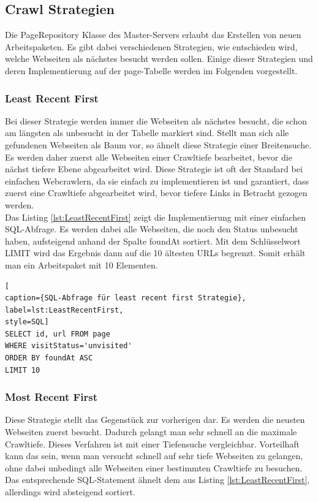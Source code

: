 \subsection{Crawl Strategien}
\label{subsec:CrawlStrategien}
Die PageRepository Klasse des Master-Servers erlaubt das Erstellen von neuen Arbeitspaketen. Es gibt dabei verschiedenen Strategien, wie entschieden wird, welche Webseiten als nächstes besucht werden sollen. Einige dieser Strategien und deren Implementierung auf der page-Tabelle werden im Folgenden vorgestellt.
\subsubsection{Least Recent First} 
Bei dieser Strategie werden immer die Webseiten als nächstes besucht, die schon am längsten als unbesucht in der Tabelle markiert sind. Stellt man sich alle gefundenen Webseiten als Baum vor, so ähnelt diese Strategie einer Breitensuche. Es werden daher zuerst alle Webseiten einer Crawltiefe bearbeitet, bevor die nächst tiefere Ebene abgearbeitet wird. Diese Strategie ist oft der Standard bei einfachen Webcrawlern, da sie einfach zu implementieren ist und garantiert, dass zuerst eine Crawltiefe abgearbeitet wird, bevor tiefere Links in Betracht gezogen werden.\\
Das Listing \ref{lst:LeastRecentFirst} zeigt die Implementierung mit einer einfachen SQL-Abfrage. Es werden dabei alle Webseiten, die noch den Status unbesucht haben, aufsteigend anhand der Spalte foundAt sortiert. Mit dem Schlüsselwort LIMIT wird das Ergebnis dann auf die 10 ältesten URLs begrenzt. Somit erhält man ein Arbeitspaket mit 10 Elementen.\\
\begin{lstlisting}[
caption={SQL-Abfrage für least recent first Strategie},
label=lst:LeastRecentFirst,
style=SQL]
SELECT id, url FROM page
WHERE visitStatus='unvisited'
ORDER BY foundAt ASC
LIMIT 10
\end{lstlisting}

\subsubsection{Most Recent First}  
Diese Strategie stellt das Gegenstück zur vorherigen dar. Es werden die neusten Webseiten zuerst besucht. Dadurch gelangt man sehr schnell an die maximale Crawltiefe. Dieses Verfahren ist mit einer Tiefensuche vergleichbar. Vorteilhaft kann das sein, wenn man versucht schnell auf sehr tiefe Webseiten zu gelangen, ohne dabei unbedingt alle Webseiten einer bestimmten Crawltiefe zu besuchen. Das entsprechende SQL-Statement ähnelt dem aus Listing \ref{lst:LeastRecentFirst}, allerdings wird absteigend sortiert.


